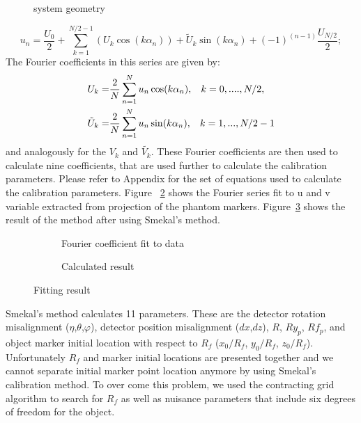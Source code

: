 \begin{figure}
\centering
{}
\caption{system geometry}
\label{fig:system_geometry}
\end{figure}

\begin{equation}\label{eq:fourierseries}
u_n = \frac{U_0}{2} + \sum ^{N/2-1}_{k=1} (U_k \cos (k\alpha_n)) + \tilde{U}_k \sin (k \alpha_n) + (-1)^{(n-1)} \frac{U_{N/2}}{2};
\end{equation}
The Fourier coefficients in this series are given by:
\begin{equation}\label{eq:fouriercoeff}
\begin{split}
U_k = & \frac{2}{N}\sum_{n=1}^{N} u_n \cos (k \alpha_n), \hspace{0.3cm} k = 0, ...., N/2, \\
\tilde{U}_k = & \frac{2}{N} \sum_{n=1}^{N} u_n \sin (k \alpha_n), \hspace{0.3cm} k = 1,...,N/2-1
\end{split}
\end{equation}
and analogously for the $V_k$ and $\tilde{V_k}$.
These Fourier coefficients are then used to calculate nine coefficients, that are used further to calculate the calibration parameters.  Please refer to Appendix for the set of equations used to calculate the calibration parameters.  Figure ~\ref{fig:FourierFit} shows the Fourier series fit to u and v variable extracted from projection of the phantom markers.  Figure~\ref{fig:smekalresult} shows the result of the method after using Smekal's method.

\begin{figure}
\centering
	\begin{subfigure}[b]{0.4\linewidth}
	\centering
	\label{fig:FourierFit}
	\caption{Fourier coefficient fit to data}
	\end{subfigure}
\hspace{0.2cm}
	\begin{subfigure}[b]{0.4\linewidth}
	\centering
	\label{fig:smekalresult}
	\caption{Calculated result}
	\end{subfigure}
\label{fig:smekal_method}	
\caption{Fitting result}
\end{figure}
Smekal's method calculates 11 parameters.  These are the detector rotation misalignment ($\eta$,$\theta$,$\varphi$), detector position misalignment ($dx$,$dz$), $R$, $Ry_p$, $Rf_p$, and object marker initial location with respect to $R_f$ ($x_0/R_f$, $y_0/R_f$, $z_0/R_f$).  Unfortunately $R_f$ and marker initial locations are presented together and we cannot separate initial marker point location anymore by using Smekal's calibration method.  To over come this problem, we used the contracting grid algorithm to search for $R_f$ as well as nuisance parameters that include six degrees of freedom for the object.
